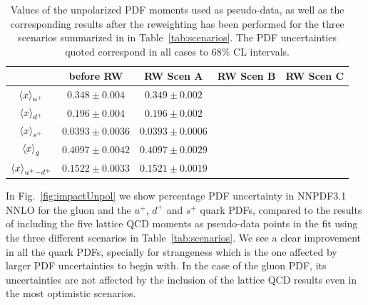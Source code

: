 \begin{table}[h]
\centering
\begin{tabular}{c|c|c|c|c}
  \hline &  before RW  & RW Scen A  &  RW Scen B  & RW Scen C  \\
  \hline
  \hline
  $\left\langle x\right\rangle_{u^+}$     &  $0.348 \pm  0.004$   &  $ 0.349 \pm 0.002$     &     &   \\
  $\left\langle x\right\rangle_{d^+}$     &  $0.196\pm  0.004$   & $0.196 \pm0.002$      &     &   \\
  $\left\langle x\right\rangle_{s^+}$     & $0.0393 \pm 0.0036$   &  $0.0393\pm 0.0006$   &     &   \\
  $\left\langle x\right\rangle_{g}$      &   $0.4097\pm 0.0042$  &  $0.4097 \pm 0.0029$    &     &   \\
  $\left\langle x\right\rangle_{u^+-d^+}$  &  $0.1522 \pm 0.0033$  &  $0.1521 \pm 0.0019$   &     &   \\
  \hline
\end{tabular}
\caption{\small Values of the unpolarized PDF moments
  used as pseudo-data, as well as the corresponding results
  after the reweighting has been performed for the
three scenarios summarized in 
in Table~\ref{tab:scenarios}.
%
The PDF uncertainties quoted correspond in all cases to 68\%
CL intervals.
\label{tab:unpolmomentsrw}
}
\end{table}

In Fig.~\ref{fig:impactUnpol} we show
percentage PDF uncertainty in NNPDF3.1 NNLO
  for the gluon and the $u^+$, $d^+$ and $s^+$ quark PDFs,
  compared to the results of including the five lattice
  QCD moments as pseudo-data points in the fit using the three
  different scenarios in  Table~\ref{tab:scenarios}.
  We see a clear improvement in all the quark PDFs, specially
  for strangeness which is the one affected by larger
  PDF uncertainties to begin with.
  In the case of the gluon PDF, its uncertainties are not
  affected by the inclusion of the lattice
  QCD results even in the most optimistic scenarios.

